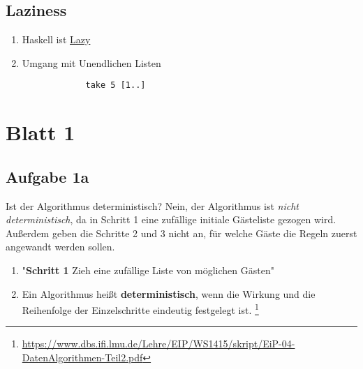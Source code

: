 \documentclass[
	aspectratio=169, 
	10pt 
]{beamer}
\begin{document}
\subsection{Laziness}
\begin{frame}[t,fragile]{\insertsubsection}
	\begin{enumerate}[$\rightarrow$]
		\item Haskell ist  \underline{Lazy}
		\item Umgang mit Unendlichen Listen
	\end{enumerate}
	
	\mbox{}\newline
	\mbox{}\newline

	\begin{center}
		\begin{minipage}{0.2\textwidth}
			\begin{verbatim}
				take 5 [1..]
			\end{verbatim}
		\end{minipage}
		\end{center}


\end{frame}

\section{Blatt 1}
\subsection{Aufgabe 1a}
\begin{frame}{\insertsubsection} 
	\begin{exercise}{Ist der Algorithmus deterministisch?}
	Nein, der Algorithmus ist \textit{nicht deterministisch}, da in Schritt 1 eine zufällige
	initiale Gästeliste gezogen wird. Außerdem geben die Schritte 2 und 3 nicht an,
	für welche Gäste die Regeln zuerst angewandt werden sollen.
	\end{exercise}

	\mbox{}

	\begin{enumerate}[$\rightarrow$]
		\item "\textbf{Schritt 1} Zieh eine zufällige Liste von möglichen Gästen"
		\item Ein Algorithmus heißt \textbf{deterministisch}, wenn die Wirkung und die Reihenfolge der Einzelschritte eindeutig festgelegt ist. \footnote[1]{\url{https://www.dbs.ifi.lmu.de/Lehre/EIP/WS1415/skript/EiP-04-DatenAlgorithmen-Teil2.pdf}}
	\end{enumerate}  
\end{frame}
\end{document}

